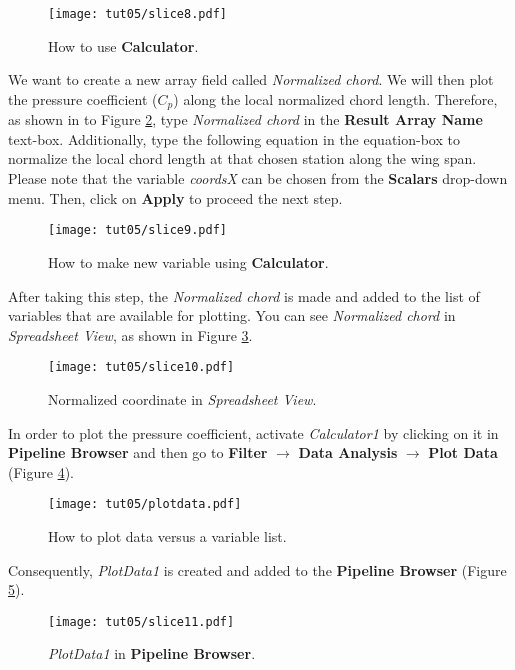 \begin{figure}[htbp]
    \centering
    \texttt{[image: tut05/slice8.pdf]}
    \caption{How to use \textbf{Calculator}.}
    \label{fig5:slice8}
\end{figure}
We want to create a new array field called \textit{Normalized chord}. We will then plot the pressure coefficient ($C_p$) along the local normalized chord length. Therefore, as shown in to Figure \ref{fig5:slice9}, type \textit{Normalized chord} in the \textbf{Result Array Name} text-box. Additionally, type the following equation in the equation-box to normalize the local chord length at that chosen station along the wing span. Please note that the variable \textit{coordsX} can be chosen from the \textbf{Scalars} drop-down menu. Then, click on \textbf{Apply} to proceed the next step.
\begin{figure}[htbp]
    \centering
    \texttt{[image: tut05/slice9.pdf]}
    \caption{How to make new variable using \textbf{Calculator}.}
    \label{fig5:slice9}
\end{figure}
After taking this step, the \textit{Normalized chord} is made and added to the list of variables that are available for plotting. You can see \textit{Normalized chord} in \textit{Spreadsheet View}, as shown in Figure \ref{fig5:slice10}.
\begin{figure}[htbp]
    \centering
    \texttt{[image: tut05/slice10.pdf]}
    \caption{Normalized coordinate in \textit{Spreadsheet View}.}
    \label{fig5:slice10}
\end{figure}

In order to plot the pressure coefficient, activate \textit{Calculator1} by clicking on it in \textbf{Pipeline Browser} and then go to \textbf{Filter} $\rightarrow$ \textbf{Data Analysis} $\rightarrow$ \textbf{Plot Data} (Figure \ref{fig5:plotdata5}).
\begin{figure}[htbp]
    \centering
    \texttt{[image: tut05/plotdata.pdf]}
    \caption{How to plot data versus a variable list.}
    \label{fig5:plotdata5}
\end{figure}
Consequently, \textit{PlotData1} is created and added to the \textbf{Pipeline Browser} (Figure \ref{fig5:slice11}).
\begin{figure}[htbp]
    \centering
    \texttt{[image: tut05/slice11.pdf]}
    \caption{\textit{PlotData1} in \textbf{Pipeline Browser}.}
    \label{fig5:slice11}
\end{figure}

